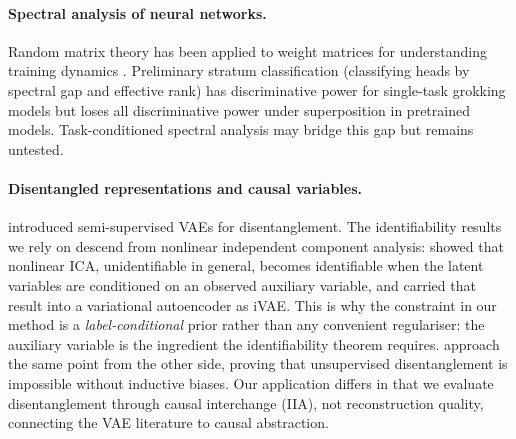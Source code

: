 \documentclass{article}
\begin{document}
\paragraph{Spectral analysis of neural networks.}
Random matrix theory has been applied to weight matrices for understanding
training dynamics \citep{martin2021implicit}. Preliminary stratum
classification (classifying heads by spectral gap and effective rank) has
discriminative power for single-task grokking models but loses all
discriminative power under superposition in pretrained models.
Task-conditioned spectral analysis may bridge this gap but remains
untested.

\paragraph{Disentangled representations and causal variables.}
\citet{narayanaswamy2017learning} introduced semi-supervised VAEs for
disentanglement. The identifiability results we rely on descend from nonlinear
independent component analysis: \citet{hyvarinen2019nonlinear} showed that
nonlinear ICA, unidentifiable in general, becomes identifiable when the latent
variables are conditioned on an observed auxiliary variable, and
\citet{khemakhem2020variational} carried that result into a variational
autoencoder as iVAE. This is why the constraint in our method is a
\emph{label-conditional} prior rather than any convenient regulariser: the
auxiliary variable is the ingredient the identifiability theorem requires.
\citet{locatello2019challenging} approach the same point from the other side,
proving that unsupervised disentanglement is impossible without inductive
biases. Our application differs in that we evaluate
disentanglement through causal interchange (IIA), not reconstruction quality,
connecting the VAE literature to causal abstraction.
\end{document}
